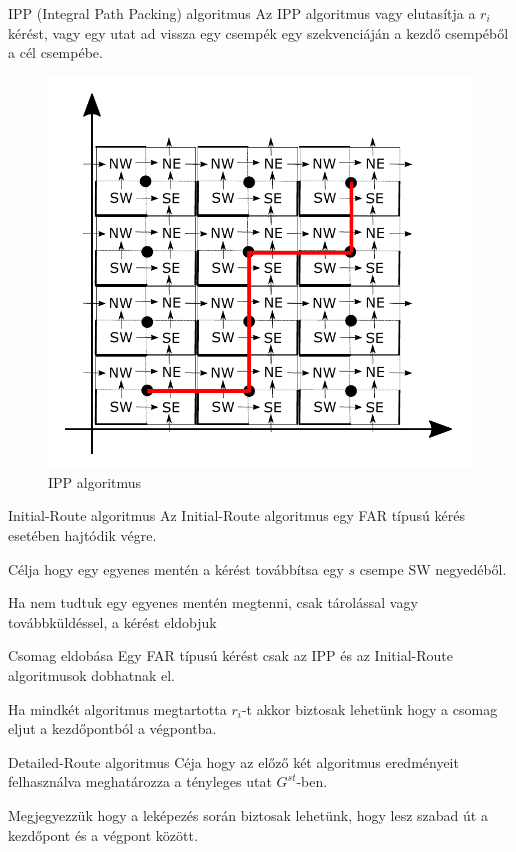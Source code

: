 \documentclass[10pt]{beamer}
\begin{document}
\begin{frame}{IPP (Integral Path Packing) algoritmus}
	Az IPP algoritmus \cite{buchbinder2006improved} vagy elutasítja a $ r_i $ kérést, vagy egy utat ad vissza egy csempék egy szekvenciáján a kezdő csempéből a cél csempébe.
	\begin{figure}
		\centering \includegraphics[width=0.55\columnwidth]{Image/ipp}
		\caption{\label{fig:ipp}IPP algoritmus}
	\end{figure}
\end{frame}

\begin{frame}{Initial-Route algoritmus}
	Az Initial-Route algoritmus egy FAR típusú kérés esetében hajtódik végre.
	
	Célja hogy egy egyenes mentén a kérést továbbítsa egy $s$ csempe SW negyedéből.
	
	Ha nem tudtuk egy egyenes mentén megtenni, csak tárolással vagy továbbküldéssel, a kérést eldobjuk
\end{frame}

\begin{frame}{Csomag eldobása}
	Egy FAR típusú kérést csak az IPP és az Initial-Route algoritmusok dobhatnak el.
	
	Ha mindkét algoritmus megtartotta $r_i$-t akkor biztosak lehetünk hogy a csomag eljut a kezdőpontból a végpontba.
\end{frame}

\begin{frame}{Detailed-Route algoritmus}
	Céja hogy az előző két algoritmus eredményeit felhasználva meghatározza a tényleges utat $G^{st}$-ben.
	
	Megjegyezzük hogy a leképezés során biztosak lehetünk, hogy lesz szabad út a kezdőpont és a végpont között.
\end{frame}
\end{document}
